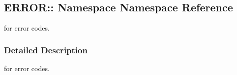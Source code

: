 \hypertarget{namespaceERROR_1_1
Namespace}{}\subsection{E\+R\+R\+OR\+:\+: Namespace Namespace Reference}
\label{namespaceERROR_1_1
Namespace}


for error codes.  




\subsubsection{Detailed Description}
for error codes. 

